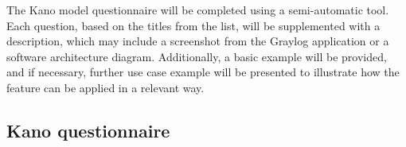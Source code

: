 \documentclass[../main.tex]{subfiles}
\begin{document}
The Kano model questionnaire will be completed using a semi-automatic tool. Each question, based on the titles from the list, will be supplemented with a description, which may include a screenshot from the Graylog application or a software architecture diagram. Additionally, a basic example will be provided, and if necessary, further use case example will be presented to illustrate how the feature can be applied in a relevant way.

\subsection{Kano questionnaire}
\end{document}

